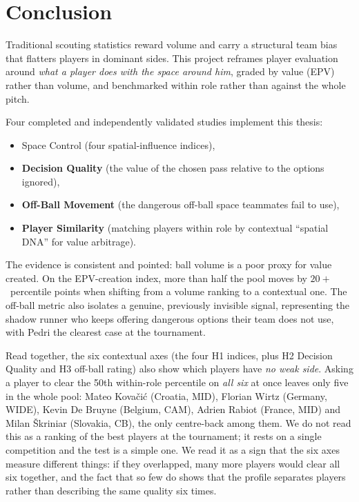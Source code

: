 \documentclass[12pt,a4paper]{article}
\begin{document}
\clearpage
\section{Conclusion}\label{sec:conclusion}

Traditional scouting statistics reward volume and carry a structural team bias that flatters players in dominant sides.
This project reframes player evaluation around \emph{what a player does with the space around him}, graded by value (EPV) rather than volume, and benchmarked within role rather than against the whole pitch.

Four completed and independently validated studies implement this thesis:
\begin{itemize}
    \item Space Control (four spatial-influence indices),
    \item \textbf{Decision Quality} (the value of the chosen pass relative to the options ignored),
    \item \textbf{Off-Ball Movement} (the dangerous off-ball space teammates fail to use),
    \item \textbf{Player Similarity} (matching players within role by contextual ``spatial DNA'' for value arbitrage).
\end{itemize}

The evidence is consistent and pointed: ball volume is a poor proxy for value created. On the EPV-creation index, more than half the pool moves by $20+$~percentile points when shifting from a volume ranking to a contextual one. The off-ball metric also isolates a genuine, previously invisible signal, representing the shadow runner who keeps offering dangerous options their team does not use, with Pedri the clearest case at the tournament.

Read together, the six contextual axes (the four H1 indices, plus H2 Decision Quality and H3 off-ball rating) also show which players have \emph{no weak side}. Asking a player to clear the 50th within-role percentile on \emph{all six} at once leaves only five in the whole pool: Mateo Kova\v{c}i\'{c} (Croatia, MID), Florian Wirtz (Germany, WIDE), Kevin De Bruyne (Belgium, CAM), Adrien Rabiot (France, MID) and Milan \v{S}kriniar (Slovakia, CB), the only centre-back among them. We do not read this as a ranking of the best players at the tournament; it rests on a single competition and the test is a simple one. We read it as a sign that the six axes measure different things: if they overlapped, many more players would clear all six together, and the fact that so few do shows that the profile separates players rather than describing the same quality six times.
\end{document}

